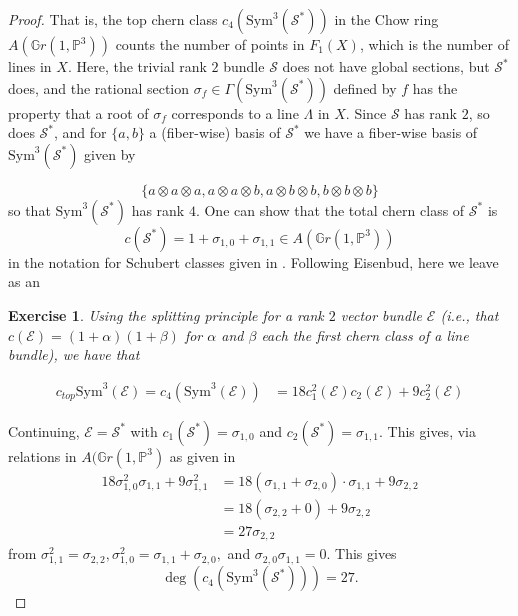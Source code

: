 \documentclass{amsart}
\newtheorem{exercise}[theorem]{Exercise}
\newcommand{\PP}{\mathbb{P}}\newcommand{\A}{\mathbb{A}}\newcommand{\Z}{\mathbb{Z}}\newcommand{\C}{\mathbb{C}}\newcommand{\N}{\mathbb{N}}\newcommand{\T}{\mathbb{T}}
\begin{document}
\begin{proof}
That is, the top chern class $c_4(\text{Sym}^3(\mathcal{S}^*))$ in the Chow ring $A(\mathbb{G}r(1,\PP^3))$ counts the number of points in $F_1(X)$, which is the number of lines in $X$. Here, the trivial rank $2$ bundle $\mathcal{S}$ does not have global sections, but $\mathcal{S}^*$ does, and the rational section $\sigma_f \in \Gamma(\text{Sym}^3(\mathcal{S}^*))$ defined by $f$ has the property that a root of $\sigma_f$ corresponds to a line $\Lambda$ in $X$. Since $\mathcal{S}$ has rank $2$, so does $\mathcal{S}^*$, and for $\{a,b\}$ a (fiber-wise) basis of $\mathcal{S}^*$ we have a fiber-wise basis of $\text{Sym}^3(\mathcal{S}^*)$ given by 

 \[ \{ a \otimes a \otimes a, a \otimes a \otimes b, a \otimes b \otimes b, b \otimes b \otimes b \} \] 
 so that $\text{Sym}^3(\mathcal{S}^*)$ has rank $4$. One can show that the total chern class of $\mathcal{S}^*$ is 
 \[ c(\mathcal{S}^*) = 1 + \sigma_{1,0} + \sigma_{1,1} \in A(\mathbb{G}r(1,\PP^3))\] 
 in the notation for Schubert classes given in \cite{eisenbud20163264}. Following Eisenbud, here we leave as an 

 \begin{exercise} Using the splitting principle for a rank $2$ vector bundle $\mathcal{E}$ (i.e., that $c(\mathcal{E}) = (1+\alpha)(1+\beta)$ for $\alpha$ and $\beta$ each the first chern class of a line bundle), we have that 

\begin{align*}
c_{top}\text{Sym}^3(\mathcal{E}) = c_4(\text{Sym}^3(\mathcal{E})) &= 18 c_1^2(\mathcal{E})c_2(\mathcal{E}) + 9 c_2^2(\mathcal{E}) 
 \end{align*}
 \end{exercise}
 
Continuing, $\mathcal{E}=\mathcal{S}^*$ with $c_1(\mathcal{S}^*) = \sigma_{1,0}$ and $c_2(\mathcal{S}^*) = \sigma_{1,1}$. This gives, via relations in $A(\mathbb{G}r(1, \PP^3)$ as given in \cite{eisenbud20163264}\\

\begin{align*}
    18 \sigma_{1,0}^2 \sigma_{1,1} + 9 \sigma_{1,1}^2 &= 18(\sigma_{1,1} + \sigma_{2,0} ) \cdot \sigma_{1,1} + 9 \sigma_{2,2}\\
    &= 18(\sigma_{2,2} + 0 ) + 9\sigma_{2,2}\\
    &= 27 \sigma_{2,2}
\end{align*} from $\sigma_{1,1}^2 = \sigma_{2,2}, \sigma_{1,0}^2 = \sigma_{1,1} + \sigma_{2,0},$ and $\sigma_{2,0}\sigma_{1,1}=0$. This gives \[ \deg(c_4(\text{Sym}^3(\mathcal{S}^*))) = 27. \] 

\end{proof} 
\end{document}
